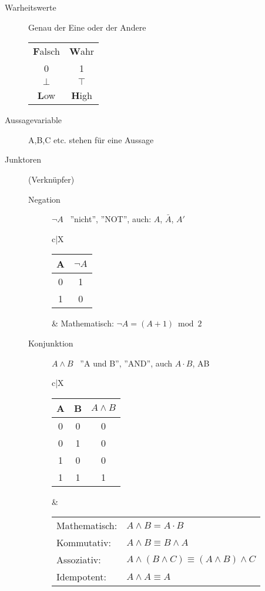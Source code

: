 \documentclass[12pt,a4paper]{article}
\begin{document}
\begin{description}
	\item[Warheitswerte] Genau der Eine oder der Andere \\
		\begin{tabular}{c|c}
			\textbf{F}alsch & \textbf{W}ahr \\
			0               & 1             \\
			$\bot$          & $\top$        \\
			\textbf{L}ow    & \textbf{H}igh
		\end{tabular}
	\item[Aussagevariable] A,B,C etc. stehen für eine Aussage
	\item[Junktoren] (Verknüpfer)
		\begin{description}
			\item[Negation] $\neg A$ \, ''nicht'', ''NOT'', auch: $A$, $\bar{A}$, $A'$ \\
				\begin{tabularx}{\linewidth}{c|X}
					\begin{tabular}[t]{c|c}
						A & $\neg A$ \\ \hline
						0 & 1        \\
						1 & 0
					\end{tabular} &
					Mathematisch: $\neg A = (A + 1) \bmod 2$ \\ \hline
				\end{tabularx}
			\item[Konjunktion] $A\wedge B$ \, ''A und B'', ''AND'', auch $A\cdot B$, AB \\
				\begin{tabularx}{\linewidth}{c|X}
					\begin{tabular}[t]{c|c||c}
						A & B & $A \wedge B$ \\ \hline\hline
						0 & 0 & 0            \\ \hline
						0 & 1 & 0            \\ \hline
						1 & 0 & 0            \\ \hline
						1 & 1 & 1
					\end{tabular} &
					\begin{tabular}[t]{ll}
						Mathematisch:               & $A \wedge B = A \cdot B$                             \\
						Kommutativ:                 & $A \wedge B \equiv B \wedge A$                       \\
						Assoziativ:                 & $A \wedge (B \wedge C) \equiv (A \wedge B) \wedge C$ \\
						Idempotent:                 & $A \wedge A \equiv A$                                \\

\end{tabular}
\end{tabularx}
\end{description}
\end{description}
\end{document}
